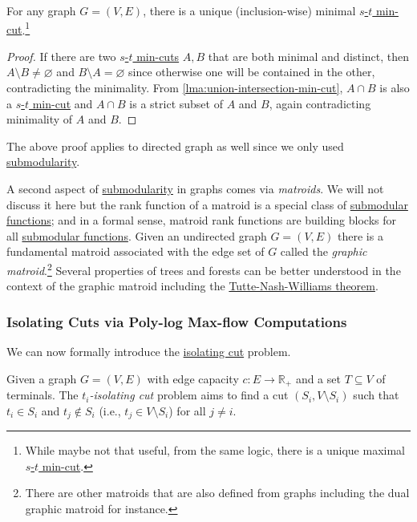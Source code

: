 \begin{corollary}\label{col:union-intersection-min-cut}
	For any graph \(G = (V, E)\), there is a unique (inclusion-wise) minimal \hyperref[prb:s-t-min-cut]{\(s\)-\(t\) min-cut}.\footnote{While maybe not that useful, from the same logic, there is a unique maximal \hyperref[prb:s-t-min-cut]{\(s\)-\(t\) min-cut}.}
\end{corollary}
\begin{proof}
	If there are two \hyperref[prb:s-t-min-cut]{\(s\)-\(t\) min-cuts} \(A, B\) that are both minimal and distinct, then \(A\setminus B \neq \varnothing \) and \(B \setminus A = \varnothing \) since otherwise one will be contained in the other, contradicting the minimality. From \autoref{lma:union-intersection-min-cut}, \(A \cap B\) is also a \hyperref[prb:s-t-min-cut]{\(s\)-\(t\) min-cut} and \(A \cap B\) is a strict subset of \(A\) and \(B\), again contradicting minimality of \(A\) and \(B\).
\end{proof}

The above proof applies to directed graph as well since we only used \hyperref[def:submodular]{submodularity}.

\begin{remark}
	A second aspect of \hyperref[def:submodular]{submodularity} in graphs comes via \emph{matroids}. We will not discuss it here but the rank function of a matroid is a special class of \hyperref[def:submodular]{submodular functions}; and in a formal sense, matroid rank functions are building blocks for all \hyperref[def:submodular]{submodular functions}. Given an undirected graph \(G = (V, E)\) there is a fundamental matroid associated with the edge set of \(G\) called the \emph{graphic matroid}.\footnote{There are other matroids that are also defined from graphs including the dual graphic matroid for instance.} Several properties of trees and forests can be better understood in the context of the graphic matroid including the \hyperref[thm:Tutte-Nash-Williams]{Tutte-Nash-Williams theorem}.
\end{remark}

\subsubsection{Isolating Cuts via Poly-log Max-flow Computations}
We can now formally introduce the \hyperref[prb:isolating-cut]{isolating cut} problem.

\begin{problem}\label{prb:isolating-cut}
Given a graph \(G = (V, E)\) with edge capacity \(c \colon E \to \mathbb{R} _+ \) and a set \(T \subseteq V\) of terminals. The \emph{\(t_i\)-isolating cut} problem aims to find a cut \((S_i, V\setminus S_i)\) such that \(t_i \in S_i\) and \(t_j \notin S_i\) (i.e., \(t_j \in V \setminus S_i\)) for all \(j \neq i\).
\end{problem}

